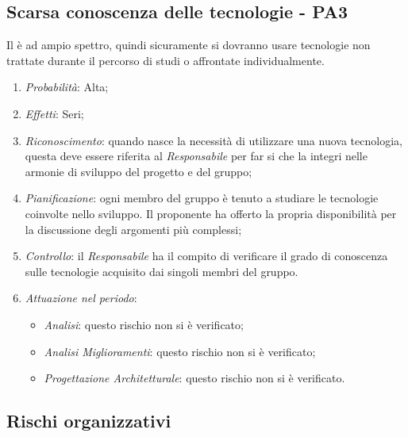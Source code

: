 \subsection{Scarsa conoscenza delle tecnologie - PA3}
Il  \`e ad ampio spettro, quindi sicuramente si dovranno usare tecnologie non trattate durante il percorso di studi o affrontate individualmente.
\begin{enumerate}
\item \textit{Probabilit\`a}: Alta;
\item \textit{Effetti}: Seri;
\item \textit{Riconoscimento}: quando nasce la necessità di utilizzare una nuova tecnologia, questa deve essere riferita al \textit{Responsabile} per far si che la integri nelle armonie di sviluppo del progetto e del gruppo;
\item \textit{Pianificazione}: ogni membro del gruppo \`e tenuto a studiare le tecnologie coinvolte nello sviluppo. Il proponente ha offerto la propria disponibilit\`a per la discussione degli argomenti pi\`u complessi;
\item \textit{Controllo}: il \textit{Responsabile} ha il compito di verificare il grado di conoscenza sulle tecnologie acquisito dai singoli membri del gruppo.
\item \textit{Attuazione nel periodo}: 
	\begin{itemize}
	\item \textit{Analisi}: questo rischio non si è verificato;
	\item \textit{Analisi Miglioramenti}: questo rischio non si è verificato;
	\item \textit{Progettazione Architetturale}: questo rischio non si è verificato.
	\end{itemize}
\end{enumerate}

\subsection{Rischi organizzativi}
